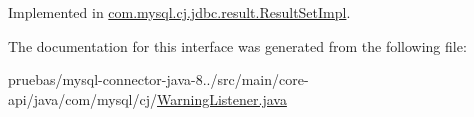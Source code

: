 Implemented in \mbox{\hyperlink{classcom_1_1mysql_1_1cj_1_1jdbc_1_1result_1_1_result_set_impl_a5ec67812de95d09373cc9551d32f75eb}{com.\+mysql.\+cj.\+jdbc.\+result.\+Result\+Set\+Impl}}.



The documentation for this interface was generated from the following file\+:\begin{DoxyCompactItemize}
\item 
pruebas/mysql-\/connector-\/java-\/8../src/main/core-\/api/java/com/mysql/cj/\mbox{\hyperlink{_warning_listener_8java}{Warning\+Listener.\+java}}\end{DoxyCompactItemize}
